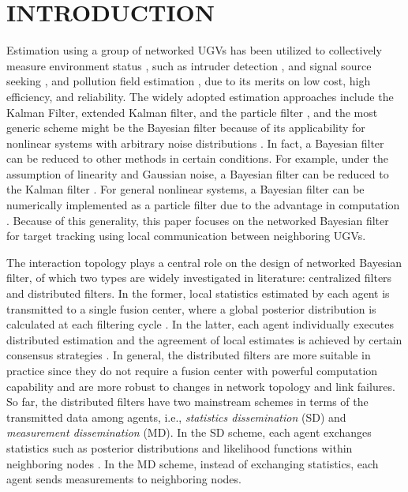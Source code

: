 \section{INTRODUCTION}
	
	Estimation using a group of networked UGVs has been utilized to collectively measure environment status \cite{hedrick2011tools}, such as intruder detection \cite{chamberland2007wireless}, and signal source seeking \cite{atanasov2015distributed}, and pollution field estimation \cite{madhag2017distributed},
	due to its merits on low cost, high efficiency, and reliability.
	The widely adopted estimation approaches include the Kalman Filter, extended Kalman filter, and the particle filter \cite{thrun2005probabilistic}, and
	the most generic scheme might be the Bayesian filter because of its applicability for nonlinear systems with arbitrary noise distributions \cite{bandyopadhyay2014distributed,julian2012distributed}.
	In fact, a Bayesian filter can be reduced to other methods in certain conditions.
	For example, under the assumption of linearity and Gaussian noise, a Bayesian filter can be reduced to the Kalman filter \cite{chen2003bayesian}.
	For general nonlinear systems, a Bayesian filter can be numerically implemented as a particle filter due to the advantage in computation \cite{chen2003bayesian}.
	Because of this generality, this paper focuses on the networked Bayesian filter for target tracking using local communication between neighboring UGVs. %
	
	The interaction topology plays a central role on the design of networked Bayesian filter, of which two types are widely investigated in literature: centralized filters and distributed filters.
	In the former, local statistics estimated by each agent is transmitted to a single fusion center, where a global posterior distribution is calculated at each filtering cycle \cite{zuo2006bandwidth,vemula2006target}. 
	In the latter, each agent individually executes distributed estimation and the agreement of local estimates is achieved by certain consensus strategies \cite{jadbabaie2003coordination,ren2005consensus,olfati2007consensus}.
	In general, the distributed filters are more suitable in practice since they do not require a fusion center with powerful computation capability and are more robust to changes in network topology and link failures. 
	So far, the distributed filters have two mainstream schemes in terms of the transmitted data among agents, i.e., \textit{statistics dissemination} (SD) and \textit{measurement dissemination} (MD). 
	In the SD scheme, each agent exchanges statistics such as posterior distributions and likelihood functions within neighboring nodes \cite{hlinka2013distributed}. 
	In the MD scheme, instead of exchanging statistics, each agent sends measurements to neighboring nodes. 
	
